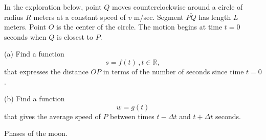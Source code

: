 \documentclass{ximera}
\begin{document}
\begin{question} \label{Q7:RightTriangle}
In the exploration below, point $Q$ moves counterclockwise around a circle of radius $R$ meters at a constant speed of $v$ m/sec. Segment $\overline{PQ}$ has length $L$ meters. Point $O$ is the center of the circle. The motion begins at time $t=0$ seconds when $Q$ is closest to $P$.

(a) Find a function 
\[
    s = f(t) \, , t \in \mathbb{R} ,
\] 
that expresses the distance $OP$ in terms of the number of seconds since time $t=0$.

(b) Find a function
\[
    w = g(t)
\]
that gives the average speed of $P$ between times $t-\Delta t$ and $t+\Delta t$ seconds.

 
\begin{exploration}

 
\begin{onlineOnly}
    \begin{center}
\end{center}
\end{onlineOnly}
\end{exploration}

\end{question}


\begin{question} \label{Q8:RightTriangle}
Phases of the moon.

\begin{exploration}

 
\begin{onlineOnly}
    \begin{center}
\end{center}
\end{onlineOnly}
\end{exploration}

\end{question}
\end{document}
